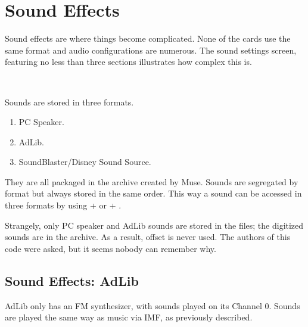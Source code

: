\section{Sound Effects}
Sound effects are where things become complicated. None of the cards use the same format and audio configurations are numerous. The sound settings screen, featuring no less than three sections illustrates how complex this is.\\
\par
{}\\
\par

\par
Sounds are stored in three formats.
\begin{enumerate}
\item PC Speaker.
\item AdLib.
\item SoundBlaster/Disney Sound Source.
\end{enumerate}
They are all packaged in the  archive created by Muse. Sounds are segregated by format but always stored in the same order. This way a sound can be accessed in three formats by using  +  or  + .\\
\par
Strangely, only PC speaker and AdLib sounds are stored in the  files; the digitized sounds are in the  archive. As a result, offset  is never used. The authors of this code were asked, but it seems nobody can remember why.\\
\par
\begin{minipage}{\textwidth}

\end{minipage}
\pagebreak




\subsection{Sound Effects: AdLib}
AdLib only has an FM synthesizer, with sounds played on its Channel 0. Sounds are played the same way as music via IMF, as previously described.\\












